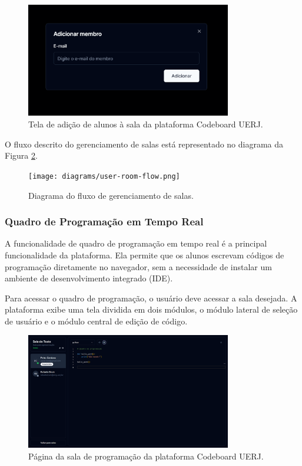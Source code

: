 \begin{figure}[H]
    \centering
    \includegraphics[width=0.8\textwidth]{assets/codeboard/add-member-modal.png}
    \caption{Tela de adição de alunos à sala da plataforma Codeboard UERJ.}
    \label{fig:add-member-modal}
\end{figure}


O fluxo descrito do gerenciamento de salas está representado no diagrama da Figura \ref{fig:user-room-flow}.


\begin{figure}[H]
    \centering
    \texttt{[image: diagrams/user-room-flow.png]}
    \caption{Diagrama do fluxo de gerenciamento de salas.}
    \label{fig:user-room-flow}
\end{figure}


\subsubsection{Quadro de Programação em Tempo Real}

 
A funcionalidade de quadro de programação em tempo real é a principal funcionalidade da plataforma. Ela permite que os alunos escrevam códigos de programação diretamente no navegador, sem a necessidade de instalar um ambiente de desenvolvimento integrado (IDE).

Para acessar o quadro de programação, o usuário deve acessar a sala desejada. A plataforma exibe uma tela dividida em dois módulos, o módulo lateral de seleção de usuário e o módulo central de edição de código.

\begin{figure}[H]
    \centering
    \includegraphics[width=0.8\textwidth]{assets/codeboard/room-details-page.png}
    \caption{Página da sala de programação da plataforma Codeboard UERJ.}
    \label{fig:room-details-page}
\end{figure}


